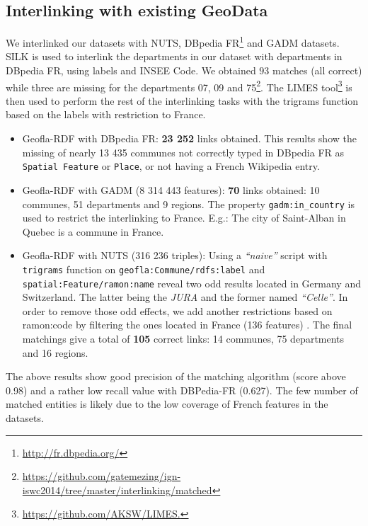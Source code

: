 \begin{itemize}


\subsection{Interlinking with existing GeoData} \label{sec:mapping}
We interlinked our datasets with NUTS, DBpedia FR\footnote{\url{http://fr.dbpedia.org/}} and GADM datasets. SILK \cite{jentzsch2010silk} is used to interlink the departments in our dataset with departments in DBpedia FR, using labels and INSEE Code. We obtained $93$ matches (all correct) while three are missing for the departments 07, 09 and 75\footnote{\url{https://github.com/gatemezing/ign-iswc2014/tree/master/interlinking/matched}}. The 
LIMES tool\footnote{\url{https://github.com/AKSW/LIMES.}} is then used to perform the rest of the interlinking tasks \cite{NGON13} with the trigrams function based on the labels with restriction to France.

\begin{itemize}
 \item Geofla-RDF with DBpedia FR: \textbf{23 252} links obtained. This results show the missing of nearly 13 435 communes not correctly typed in DBpedia FR as \texttt{Spatial Feature} or \texttt{Place}, or not having a French Wikipedia entry.
 \item Geofla-RDF with GADM (8 314 443 features): \textbf{70} links obtained: 10 communes, 51 departments and 9 regions. The property \texttt{gadm:in\_country} is used to restrict the interlinking to France. E.g.: The city of Saint-Alban in Quebec is a commune in France.
 \item Geofla-RDF with NUTS (316 236 triples): Using a \textit{``naive''} script with \texttt{trigrams} function on \texttt{geofla:Commune/rdfs:label} and \texttt{spatial:Feature/ramon:name} reveal two odd results located in Germany and Switzerland. The latter being the \textit{JURA } and the former named \textit{``Celle''}.  In order to remove those odd effects, we add another restrictions based on \textsf{ramon:code} by filtering the ones located in France (136 features) . The final matchings give a total of \textbf{105} correct links: 14 communes, 75 departments and 16 regions.
\end{itemize}

The above results show good precision of the matching algorithm (score above 0.98) and a rather low recall value with DBPedia-FR (0.627). The few number of matched entities is likely due to the low coverage of French features  in the datasets. 



\end{itemize}
